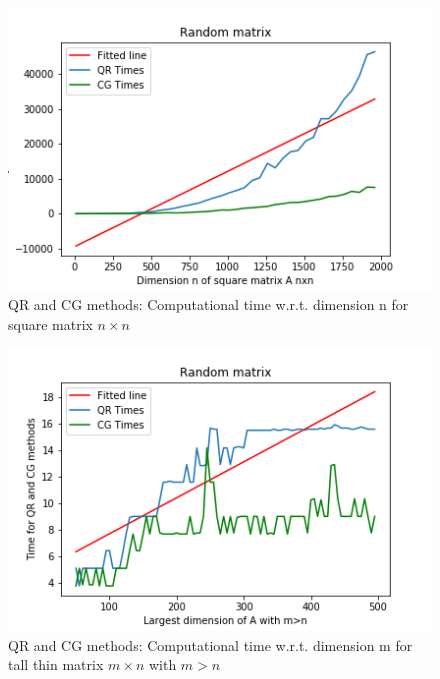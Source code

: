 \documentclass{article}
\begin{document}
        \begin{figure}
            \includegraphics[width=\linewidth]{../results/square.png}
            \caption{QR and CG methods: Computational time w.r.t. dimension n for square matrix $n \times n$}
            \label{square}
        \end{figure}
        \begin{figure}
            \includegraphics[width=\linewidth]{../results/little_m.png}
            \caption{QR and CG methods: Computational time w.r.t. dimension m for tall thin matrix $m \times n$ with $m > n$}
            \label{little_m}
        \end{figure}
\end{document}
